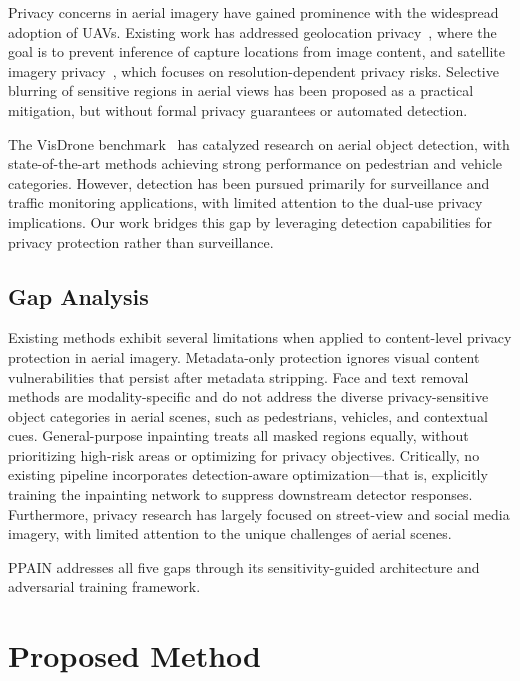 \documentclass[preprint,12pt]{elsarticle}
\begin{document}
Privacy concerns in aerial imagery have gained prominence with the widespread adoption of UAVs. Existing work has addressed geolocation privacy~\cite{varela2014geolocation}, where the goal is to prevent inference of capture locations from image content, and satellite imagery privacy~\cite{kpegas2021privacy}, which focuses on resolution-dependent privacy risks. Selective blurring of sensitive regions in aerial views has been proposed as a practical mitigation, but without formal privacy guarantees or automated detection.

The VisDrone benchmark~\cite{visdrone2019,du2020visdrone} has catalyzed research on aerial object detection, with state-of-the-art methods achieving strong performance on pedestrian and vehicle categories. However, detection has been pursued primarily for surveillance and traffic monitoring applications, with limited attention to the dual-use privacy implications. Our work bridges this gap by leveraging detection capabilities for privacy protection rather than surveillance.

\subsection{Gap Analysis}

Existing methods exhibit several limitations when applied to content-level privacy protection in aerial imagery. Metadata-only protection ignores visual content vulnerabilities that persist after metadata stripping. Face and text removal methods are modality-specific and do not address the diverse privacy-sensitive object categories in aerial scenes, such as pedestrians, vehicles, and contextual cues. General-purpose inpainting treats all masked regions equally, without prioritizing high-risk areas or optimizing for privacy objectives. Critically, no existing pipeline incorporates detection-aware optimization---that is, explicitly training the inpainting network to suppress downstream detector responses. Furthermore, privacy research has largely focused on street-view and social media imagery, with limited attention to the unique challenges of aerial scenes.

PPAIN addresses all five gaps through its sensitivity-guided architecture and adversarial training framework.


\section{Proposed Method}
\label{sec:method}
\end{document}
